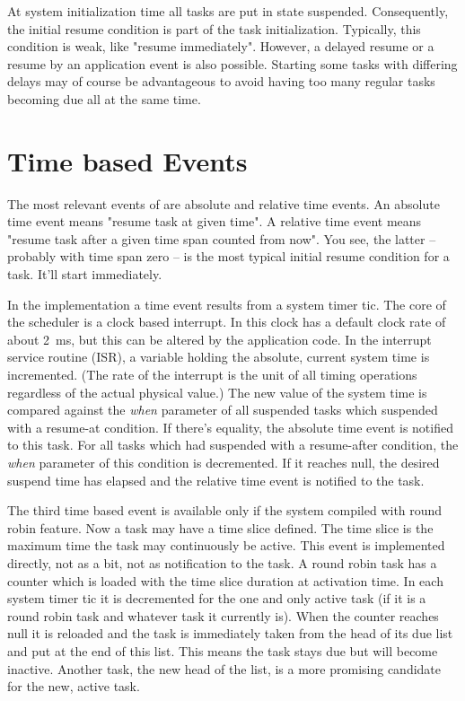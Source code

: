 At system initialization time all tasks are put in state suspended.
Consequently, the initial resume condition is part of the task
initialization. Typically, this condition is weak, like "resume
immediately". However, a delayed resume or a resume by an application
event is also possible. Starting some tasks with differing delays may of
course be advantageous to avoid having too many regular tasks becoming due
all at the same time.


\section{Time based Events}
\label{secTimeBasedEvents}

The most relevant events of \rtos{} are absolute and relative time events.
An absolute time event means "resume task at given time". A relative time
event means "resume task after a given time span counted from now". You
see, the latter -- probably with time span zero -- is the most typical
initial resume condition for a task. It'll start immediately.

In the implementation a time event results from a system timer tic. The
core of the scheduler is a clock based interrupt. In \rtos{} this clock
has a default clock rate of about 2~ms, but this can be altered by the
application code. In the interrupt service routine (ISR), a variable
holding the absolute, current system time is incremented. (The rate of the
interrupt is the unit of all timing operations regardless of the actual
physical value.) The new value of the system time is compared against the
\emph{when} parameter of all suspended tasks which suspended with a
resume-at condition. If there's equality, the absolute time event is
notified to this task. For all tasks which had suspended with a
resume-after condition, the \emph{when} parameter of this condition is
decremented. If it reaches null, the desired suspend time has elapsed and
the relative time event is notified to the task.

The third time based event is available only if the system compiled with
round robin feature. Now a task may have a time slice defined. The time
slice is the maximum time the task may continuously be active. This event
is implemented directly, not as a bit, not as notification to the task. A
round robin task has a counter which is loaded with the time slice
duration at activation time. In each system timer tic it is decremented
for the one and only active task (if it is a round robin task and whatever
task it currently is). When the counter reaches null it is reloaded and
the task is immediately taken from the head of its due list and put at the
end of this list. This means the task stays due but will become inactive.
Another task, the new head of the list, is a more promising candidate for
the new, active task.

